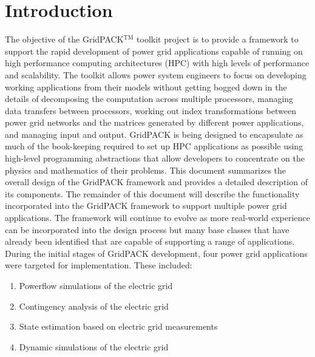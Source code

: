 \chapter{Introduction}

The objective of the GridPACK$\mathrm{{}^{TM}}$ toolkit project is to provide a framework to support the rapid development of power grid applications capable of running on high performance computing architectures (HPC) with high levels of performance and scalability. The toolkit allows power system engineers to focus on developing working applications from their models without getting bogged down in the details of decomposing the computation across multiple processors, managing data transfers between processors, working out index transformations between power grid networks and the matrices generated by different power applications, and managing input and output. GridPACK is being designed to encapsulate as much of the book-keeping required to set up HPC applications as possible using high-level programming abstractions that allow developers to concentrate on the physics and mathematics of their problems.
This document summarizes the overall design of the GridPACK framework and provides a detailed description of its components. The remainder of this document will describe the functionality incorporated into the GridPACK framework to support multiple power grid applications. The framework will continue to evolve as more real-world experience can be incorporated into the design process but many base classes that have already been identified that are capable of supporting a range of applications.
During the initial stages of GridPACK development, four power grid applications were targeted for implementation. These included:
\begin{enumerate}
\item  Powerflow simulations of the electric grid

\item  Contingency analysis of the electric grid

\item  State estimation based on electric grid measurements

\item  Dynamic simulations of the electric grid
\end{enumerate}

